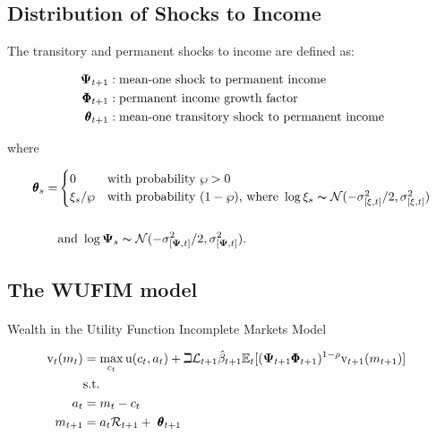 \documentclass[
  letterpaper,
  DIV=11,
  numbers=noendperiod]{scrartcl}
\makeatletter
\let\oldparagraph\paragraph
\renewcommand{\paragraph}{
    \@ifstar
      \xxxParagraphStar
      \xxxParagraphNoStar
  }
\newcommand{\xxxParagraphStar}[1]{\oldparagraph*{#1}\mbox{}}
\newcommand{\xxxParagraphNoStar}[1]{\oldparagraph{#1}\mbox{}}
\makeatother
\begin{document}
\subsection{Distribution of Shocks to
Income}\label{distribution-of-shocks-to-income}

The transitory and permanent shocks to income are defined as:

\[\begin{aligned}
  \mathbf{\Psi}_{t+1} & :  \text{mean-one shock to permanent income}
    \\ \pmb{\Phi}_{t+1} & :  \text{permanent income growth factor}
    \\ \pmb{\theta}_{t+1} & :  \text{mean-one transitory shock to permanent income}
\end{aligned}\]

where

\[\begin{aligned}
\TranShkEmp_{s}  = & \begin{cases} 0  & \text{with probability } \pZero>0  \\ 
\xi_{s}/\pZero & \text{with probability } (1-\pZero) \text{, where } \log \xi_{s}\thicksim \mathcal{N}(-\sigma_{[\xi, t]}^{2}/2,\sigma_{[\xi, t]}^{2}) \end{cases} \\
\phantom{/\pZero} \\ & \text{and }  \log \PermShk_{s}   \thicksim \mathcal{N}(-\sigma_{[\PermShk, t]}^{2}/2,\sigma_{[\PermShk, t]}^{2}).
\end{aligned}\]

\subsection{The WUFIM model}\label{the-wufim-model}

\paragraph{Wealth in the Utility Function Incomplete Markets
Model}\label{wealth-in-the-utility-function-incomplete-markets-model}

\[\begin{aligned}
    {\mathrm{v}}_{t}({m}_{t}) & = \max_{c_{t}}  \mathrm{u}(c_{t}, a_{t})+\beth\mathcal{L}_{t+1}\hat{\beta}_{t+1}
    \mathbb{E}_{t}[(\mathbf{\Psi}_{t+1}\pmb{\Phi}_{t+1})^{1-\rho}{\mathrm{v}}_{t+1}({m}_{t+1})]
    \\ & \text{s.t.} & 
    \\ a_{t} & = {m}_{t}-c_{t} 
    \\ {m}_{t+1} & = a_{t}\mathcal{R}_{t+1}+ ~\pmb{\theta}_{t+1}
\end{aligned}\]
\end{document}
